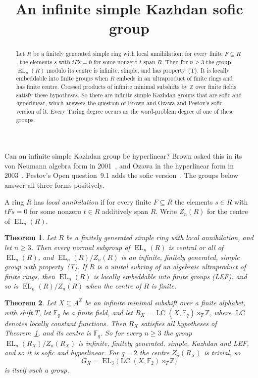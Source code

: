 \documentclass[11pt]{amsart}
\newtheorem{theorem}{Theorem}
\newcommand{\F}{\mathbb F}
\newcommand{\Z}{\mathbb Z}
\newcommand{\LC}{\operatorname{LC}}
\newcommand{\EL}{\operatorname{EL}}
\begin{document}
\title{An infinite simple Kazhdan sofic group}
\author{\paperauthorname}
\date{}

\begin{abstract}
Let $R$ be a finitely generated simple ring with local annihilation:
for every finite $F\subseteq R$, the elements $s$ with $tFs=0$ for some
nonzero $t$ span $R$. Then for $n\ge3$ the group $\EL_n(R)$ modulo its
centre is infinite, simple, and has property~\textup{(T)}. It is locally
embeddable into finite groups when $R$ embeds in an ultraproduct of
finite rings and has finite centre. Crossed products of infinite minimal
subshifts by $\Z$ over finite fields satisfy these hypotheses. So there
are infinite simple Kazhdan groups that are sofic and hyperlinear, which
answers the question of Brown and Ozawa and Pestov's sofic version of
it. Every Turing degree occurs as the word-problem degree of one of
these groups.
\end{abstract}
\maketitle

Can an infinite simple Kazhdan group be hyperlinear? Brown asked this
in its von Neumann algebra form in 2001~\cite[\S11, Question~7]{Brown},
and Ozawa in the hyperlinear form in 2003~\cite[p.~527]{Ozawa}.
Pestov's Open question~9.1 adds the sofic version~\cite{Pestov}.
The groups below answer all three forms positively.

A ring $R$ has \emph{local annihilation} if for every finite
$F\subseteq R$ the elements $s\in R$ with $tFs=0$ for some nonzero
$t\in R$ additively span $R$. Write $Z_n(R)$ for the centre of
$\EL_n(R)$.

\begin{theorem}\label{thm:ring}
Let $R$ be a finitely generated simple ring with local annihilation, and
let $n\ge3$. Then every normal subgroup of $\EL_n(R)$ is central or all
of $\EL_n(R)$, and $\EL_n(R)/Z_n(R)$ is an infinite, finitely generated,
simple group with property~\textup{(T)}. If $R$ is a unital subring of
an algebraic ultraproduct of finite rings, then $\EL_n(R)$ is locally
embeddable into finite groups \textup{(LEF)}, and so is
$\EL_n(R)/Z_n(R)$ when the centre of $R$ is finite.
\end{theorem}

\begin{theorem}\label{thm:main}
Let $X\subseteq A^{\Z}$ be an infinite minimal subshift over a finite
alphabet, with shift $T$, let $\F_q$ be a finite field, and let
$R_X=\LC(X,\F_q)\rtimes_T\Z$, where $\LC$ denotes locally constant
functions. Then $R_X$ satisfies all hypotheses of
Theorem~\ref{thm:ring}, and its centre is $\F_q$. So for every $n\ge3$
the group $\EL_n(R_X)/Z_n(R_X)$ is infinite, finitely generated, simple,
Kazhdan and LEF, and so it is sofic and hyperlinear. For $q=2$ the
centre $Z_n(R_X)$ is trivial, so
\[
  G_X=\EL_3\bigl(\LC(X,\F_2)\rtimes_T\Z\bigr)
\]
is itself such a group.
\end{theorem}
\end{document}
